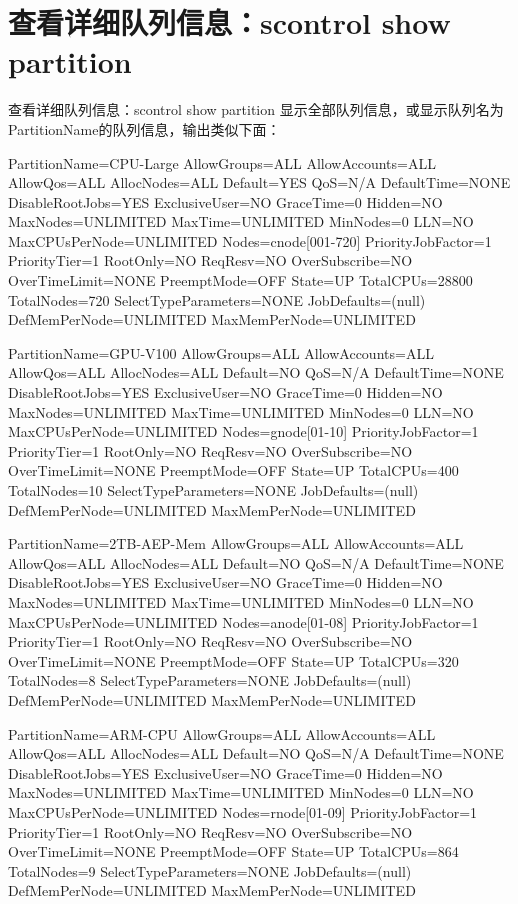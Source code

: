 \section{查看详细队列信息：scontrol show partition}
\begin{frame}[fragile]{查看详细队列信息：scontrol show partition}
显示全部队列信息，或显示队列名为PartitionName的队列信息，输出类似下面：
\small
\begin{OUT}
PartitionName=CPU-Large
   AllowGroups=ALL AllowAccounts=ALL AllowQos=ALL
   AllocNodes=ALL Default=YES QoS=N/A
   DefaultTime=NONE DisableRootJobs=YES ExclusiveUser=NO GraceTime=0 Hidden=NO
   MaxNodes=UNLIMITED MaxTime=UNLIMITED MinNodes=0 LLN=NO MaxCPUsPerNode=UNLIMITED
   Nodes=cnode[001-720]
   PriorityJobFactor=1 PriorityTier=1 RootOnly=NO ReqResv=NO OverSubscribe=NO
   OverTimeLimit=NONE PreemptMode=OFF
   State=UP TotalCPUs=28800 TotalNodes=720 SelectTypeParameters=NONE
   JobDefaults=(null)
   DefMemPerNode=UNLIMITED MaxMemPerNode=UNLIMITED

PartitionName=GPU-V100
   AllowGroups=ALL AllowAccounts=ALL AllowQos=ALL
   AllocNodes=ALL Default=NO QoS=N/A
   DefaultTime=NONE DisableRootJobs=YES ExclusiveUser=NO GraceTime=0 Hidden=NO
   MaxNodes=UNLIMITED MaxTime=UNLIMITED MinNodes=0 LLN=NO MaxCPUsPerNode=UNLIMITED
   Nodes=gnode[01-10]
   PriorityJobFactor=1 PriorityTier=1 RootOnly=NO ReqResv=NO OverSubscribe=NO
   OverTimeLimit=NONE PreemptMode=OFF
   State=UP TotalCPUs=400 TotalNodes=10 SelectTypeParameters=NONE
   JobDefaults=(null)
   DefMemPerNode=UNLIMITED MaxMemPerNode=UNLIMITED

PartitionName=2TB-AEP-Mem
   AllowGroups=ALL AllowAccounts=ALL AllowQos=ALL
   AllocNodes=ALL Default=NO QoS=N/A
   DefaultTime=NONE DisableRootJobs=YES ExclusiveUser=NO GraceTime=0 Hidden=NO
   MaxNodes=UNLIMITED MaxTime=UNLIMITED MinNodes=0 LLN=NO MaxCPUsPerNode=UNLIMITED
   Nodes=anode[01-08]
   PriorityJobFactor=1 PriorityTier=1 RootOnly=NO ReqResv=NO OverSubscribe=NO
   OverTimeLimit=NONE PreemptMode=OFF
   State=UP TotalCPUs=320 TotalNodes=8 SelectTypeParameters=NONE
   JobDefaults=(null)
   DefMemPerNode=UNLIMITED MaxMemPerNode=UNLIMITED

PartitionName=ARM-CPU
   AllowGroups=ALL AllowAccounts=ALL AllowQos=ALL
   AllocNodes=ALL Default=NO QoS=N/A
   DefaultTime=NONE DisableRootJobs=YES ExclusiveUser=NO GraceTime=0 Hidden=NO
   MaxNodes=UNLIMITED MaxTime=UNLIMITED MinNodes=0 LLN=NO MaxCPUsPerNode=UNLIMITED
   Nodes=rnode[01-09]
   PriorityJobFactor=1 PriorityTier=1 RootOnly=NO ReqResv=NO OverSubscribe=NO
   OverTimeLimit=NONE PreemptMode=OFF
   State=UP TotalCPUs=864 TotalNodes=9 SelectTypeParameters=NONE
   JobDefaults=(null)
   DefMemPerNode=UNLIMITED MaxMemPerNode=UNLIMITED
\end{OUT}
\end{frame}

